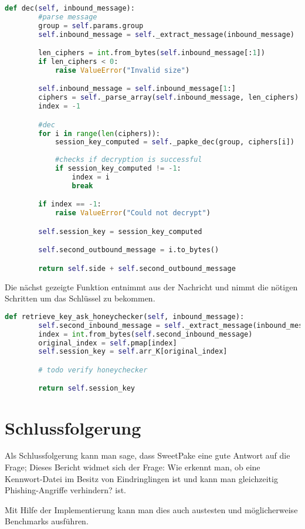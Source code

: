 \documentclass[conference, compsoc]{IEEEtran}
\begin{document}
\begin{lstlisting}[language=Python]
def dec(self, inbound_message):
        #parse message
        group = self.params.group
        self.inbound_message = self._extract_message(inbound_message)

        len_ciphers = int.from_bytes(self.inbound_message[:1])
        if len_ciphers < 0:
            raise ValueError("Invalid size")

        self.inbound_message = self.inbound_message[1:]
        ciphers = self._parse_array(self.inbound_message, len_ciphers)
        index = -1

        #dec
        for i in range(len(ciphers)):
            session_key_computed = self._papke_dec(group, ciphers[i])
            
            #checks if decryption is successful
            if session_key_computed != -1:
                index = i
                break

        if index == -1:
            raise ValueError("Could not decrypt")

        self.session_key = session_key_computed

        self.second_outbound_message = i.to_bytes()

        return self.side + self.second_outbound_message

\end{lstlisting}

Die nächst gezeigte Funktion entnimmt aus der Nachricht und nimmt die nötigen Schritten
um das Schlüssel zu bekommen.

\begin{lstlisting}[language=Python]
def retrieve_key_ask_honeychecker(self, inbound_message):
        self.second_inbound_message = self._extract_message(inbound_message)
        index = int.from_bytes(self.second_inbound_message)
        original_index = self.pmap[index]
        self.session_key = self.arr_K[original_index]

        # todo verify honeychecker

        return self.session_key
\end{lstlisting}

\section{Schlussfolgerung}
Als Schlussfolgerung kann man sage, dass SweetPake eine gute Antwort auf die
Frage; Dieses Bericht widmet sich der Frage: Wie erkennt man, ob eine
Kennwort-Datei im Besitz von Eindringlingen ist und kann man gleichzeitig
Phishing-Angriffe verhindern? ist.

Mit Hilfe der Implementierung kann man dies auch austesten und möglicherweise
Benchmarks ausführen.

\printbibliography
\end{document}
